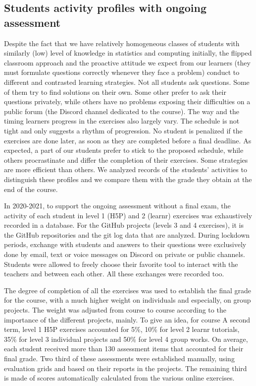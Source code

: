 \documentclass{aims}
\theoremstyle{definition}
\begin{document}
\hypertarget{students-activity-profiles-with-ongoing-assessment}{%
\subsection{Students activity profiles with ongoing
assessment}\label{students-activity-profiles-with-ongoing-assessment}}

Despite the fact that we have relatively homogeneous classes of students
with similarly (low) level of knowledge in statistics and computing
initially, the flipped classroom approach and the proactive attitude we
expect from our learners (they must formulate questions correctly
whenever they face a problem) conduct to different and contrasted
learning strategies. Not all students ask questions. Some of them try to
find solutions on their own. Some other prefer to ask their questions
privately, while others have no problems exposing their difficulties on
a public forum (the Discord channel dedicated to the course). The way
and the timing learners progress in the exercises also largely vary. The
schedule is not tight and only suggests a rhythm of progression. No
student is penalized if the exercises are done later, as soon as they
are completed before a final deadline. As expected, a part of our
students prefer to stick to the proposed schedule, while others
procrastinate and differ the completion of their exercises. Some
strategies are more efficient than others. We analyzed records of the
students' activities to distinguish these profiles and we compare them
with the grade they obtain at the end of the course.

In 2020-2021, to support the ongoing assessment without a final exam,
the activity of each student in level 1 (H5P) and 2 (learnr) exercises
was exhaustively recorded in a database. For the GitHub projects (levels
3 and 4 exercises), it is the GitHub repositories and the git log data
that are analyzed. During lockdown periods, exchange with students and
answers to their questions were exclusively done by email, text or voice
messages on Discord on private or public channels. Students were allowed
to freely choose their favorite tool to interact with the teachers and
between each other. All these exchanges were recorded too.

The degree of completion of all the exercises was used to establish the
final grade for the course, with a much higher weight on individuals and
especially, on group projects. The weight was adjusted from course to
course according to the importance of the different projects, mainly. To
give an idea, for course A second term, level 1 H5P exercises accounted
for 5\%, 10\% for level 2 learnr tutorials, 35\% for level 3 individual
projects and 50\% for level 4 group works. On average, each student
received more than 130 assessment items that accounted for their final
grade. Two third of these assessments were established manually, using
evaluation grids and based on their reports in the projects. The
remaining third is made of scores automatically calculated from the
various online exercises.
\end{document}
